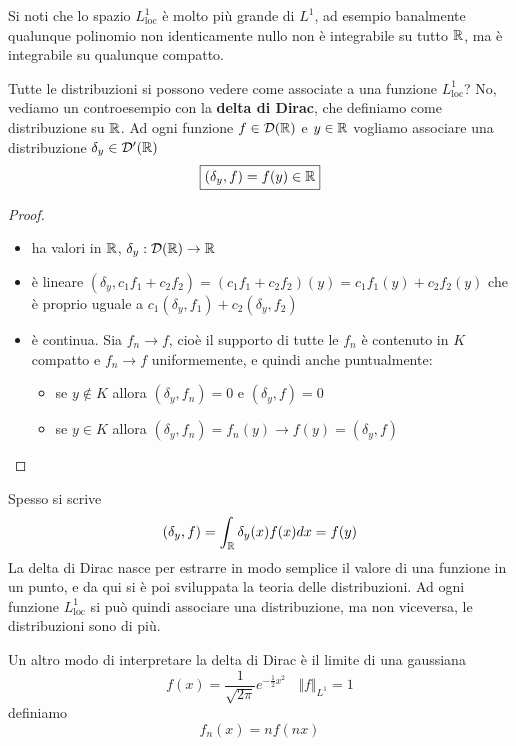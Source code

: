 Si noti che lo spazio $L^{1}_{\mathrm{loc}}$ è molto più grande di $L^{1}$, ad esempio banalmente qualunque polinomio non identicamente nullo non è integrabile su tutto $\mathbb{R}$, ma è integrabile su qualunque compatto.

Tutte le distribuzioni si possono vedere come associate a una funzione $L^{1}_{\mathrm{loc}}$? No, vediamo un controesempio con la \textbf{delta di Dirac}, che definiamo come distribuzione su $\mathbb{R}$. Ad ogni funzione $f\in \mathcal{D}(\mathbb{R})$ e $y\in \mathbb{R}$ vogliamo associare una distribuzione $\delta_{y} \in \mathcal{D}'(\mathbb{R})$
\begin{equation*}
\boxed{(\delta_{y}, f) = f(y) \in \mathbb{R}}
\end{equation*}
\begin{proof}\leavevmode
\begin{itemize}
\item ha valori in $\mathbb{R}$, $\delta_{y} : \mathcal{D}(\mathbb{R})\rightarrow \mathbb{R}$
\item è lineare $(\delta_{y}, c_{1} f_{1} + c_{2} f_{2}) = (c_{1} f_{1} + c_{2} f_{2})(y) = c_{1} f_{1}(y) + c_{2} f_{2}(y)$ che è proprio uguale a $c_{1}(\delta_{y}, f_{1}) + c_{2}(\delta_{y}, f_{2})$
\item è continua. Sia $f_{n}\rightarrow f$, cioè il supporto di tutte le $f_{n}$ è contenuto in $K$ compatto e $f_{n}\rightarrow f$ uniformemente, e quindi anche puntualmente:
\begin{itemize}
\item se $y\notin K$ allora $(\delta_{y}, f_{n}) = 0$ e $(\delta_{y}, f) = 0$
\item se $y\in K$ allora $(\delta_{y}, f_{n}) = f_{n}(y)\rightarrow f(y) = (\delta_{y}, f)$
\end{itemize}

\end{itemize}
\end{proof}
Spesso si scrive
\begin{equation*}
(\delta_{y}, f) = \int_{\mathbb{R}} \delta_{y}(x) f(x) dx = f(y)
\end{equation*}
La delta di Dirac nasce per estrarre in modo semplice il valore di una funzione in un punto, e da qui si è poi sviluppata la teoria delle distribuzioni. Ad ogni funzione $L^{1}_{\mathrm{loc}}$ si può quindi associare una distribuzione, ma non viceversa, le distribuzioni sono di più.

Un altro modo di interpretare la delta di Dirac è il limite di una gaussiana
\begin{equation*}
f(x) = \frac{1}{\sqrt{2\pi}} e^{- \frac{1}{2} x^{2}} \ \ \ \ \Vert f \Vert_{L^{1}} = 1
\end{equation*}
definiamo
\begin{equation*}
f_{n}(x) = nf(nx)
\end{equation*}

